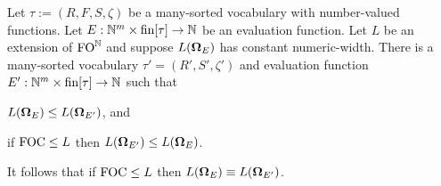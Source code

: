 \documentclass[../main/thesis.tex]{subfiles}
\begin{document}
\begin{prop}
  Let $\tau := (R, F, S, \zeta)$ be a many-sorted vocabulary with number-valued
  functions. Let $E : \mathbb{N}^m \times \text{\upshape fin}{[\tau]} \rightarrow \mathbb{N}$ be an evaluation
  function. Let $L$ be an extension of $\text{\upshape FO}^{\mathbb{N}}$ and suppose $L(\mathbf{\mathbf{\Omega}}_E)$
  has constant numeric-width. There is a many-sorted vocabulary $\tau' = (R',
  S', \zeta')$ and evaluation function $E' : \mathbb{N}^m \times \text{\upshape fin}{[\tau]} \rightarrow
  \mathbb{N}$ such that
  \begin{myenum}
  \item \label{obj:left-right} $L(\mathbf{\mathbf{\Omega}}_{E}) \leq L(\mathbf{\mathbf{\Omega}}_{E'})$, and
  \item \label{obj:FOC-right-left} if $\text{\upshape FOC} \leq L$ then $L(\mathbf{\mathbf{\Omega}}_{E'}) \leq
    L(\mathbf{\mathbf{\Omega}}_{E})$.
  \end{myenum}
  It follows that if $\text{\upshape FOC} \leq L$ then $L(\mathbf{\mathbf{\Omega}}_{E}) \equiv L(\mathbf{\mathbf{\Omega}}_{E'})$.
  \label{prop:operators-to-onformulas}
\end{prop}
\end{document}
